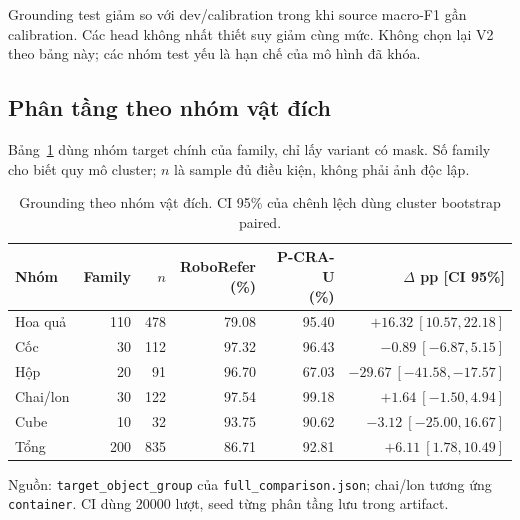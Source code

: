 Grounding test giảm so với dev/calibration trong
khi source macro-F1 gần calibration. Các head
không nhất thiết suy giảm cùng mức. Không chọn
lại V2 theo bảng này; các nhóm test yếu là
hạn chế của mô hình đã khóa.

\subsection{Phân tầng theo nhóm vật đích}

Bảng~\ref{tab:results-object-strata} dùng nhóm
target chính của family, chỉ lấy variant có
mask. Số family cho biết quy mô cluster; $n$
là sample đủ điều kiện, không phải ảnh độc lập.

\begin{table}[htbp]
    \centering
    \setlength{\tabcolsep}{4pt}
    \renewcommand{\arraystretch}{1.15}
    \caption{Grounding theo nhóm vật đích.
    CI 95\% của chênh lệch dùng cluster bootstrap paired.}
    \label{tab:results-object-strata}
    \small
    \begin{tabularx}{\textwidth}{@{}>{\raggedright\arraybackslash}Xrrrrr@{}}
        \toprule
        Nhóm & Family & $n$ & \shortstack{RoboRefer\\(\%)} & \shortstack{P-CRA-U\\(\%)} & \shortstack{$\Delta$ pp\\{[CI 95\%]}} \\
        \midrule
        Hoa quả & 110 & 478 & 79.08 & 95.40 & $+16.32\ [10.57,22.18]$ \\
        Cốc & 30 & 112 & 97.32 & 96.43 & $-0.89\ [-6.87,5.15]$ \\
        Hộp & 20 & 91 & 96.70 & 67.03 & $-29.67\ [-41.58,-17.57]$ \\
        Chai/lon & 30 & 122 & 97.54 & 99.18 & $+1.64\ [-1.50,4.94]$ \\
        Cube & 10 & 32 & 93.75 & 90.62 & $-3.12\ [-25.00,16.67]$ \\
        \midrule
        Tổng & 200 & 835 & 86.71 & 92.81 & $+6.11\ [1.78,10.49]$ \\
        \bottomrule
    \end{tabularx}
    \vspace{2pt}
    {\footnotesize\raggedright Nguồn: \texttt{target\_\allowbreak object\_\allowbreak group}
    của \texttt{full\_\allowbreak comparison.json}; chai/lon tương ứng
    \texttt{container}. CI dùng 20000 lượt, seed từng
    phân tầng lưu trong artifact.\par}
\end{table}

